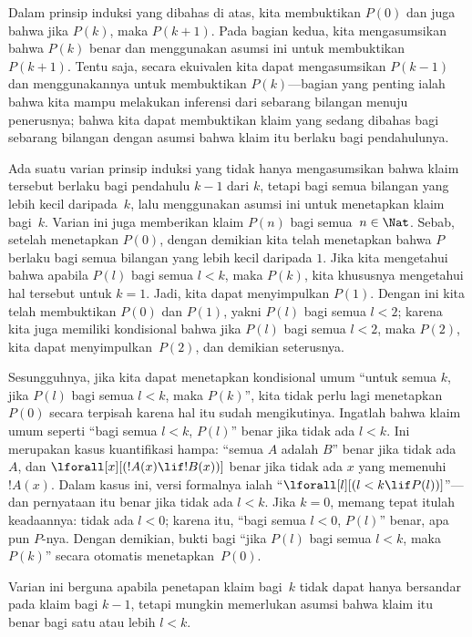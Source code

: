 \documentclass[../../../include/open-logic-section]{subfiles}
\begin{document}


Dalam prinsip induksi yang dibahas di atas, kita membuktikan $P(0)$ dan juga
bahwa jika $P(k)$, maka $P(k+1)$. Pada bagian kedua, kita mengasumsikan bahwa
$P(k)$ benar dan menggunakan asumsi ini untuk membuktikan $P(k+1)$. Tentu
saja, secara ekuivalen kita dapat mengasumsikan $P(k-1)$ dan menggunakannya
untuk membuktikan $P(k)$---bagian yang penting ialah bahwa kita mampu
melakukan inferensi dari sebarang bilangan menuju penerusnya; bahwa kita
dapat membuktikan klaim yang sedang dibahas bagi sebarang bilangan dengan
asumsi bahwa klaim itu berlaku bagi pendahulunya.

Ada suatu varian prinsip induksi yang tidak hanya mengasumsikan bahwa klaim
tersebut berlaku bagi pendahulu $k-1$ dari $k$, tetapi bagi semua bilangan
yang lebih kecil daripada~$k$, lalu menggunakan asumsi ini untuk menetapkan
klaim bagi~$k$. Varian ini juga memberikan klaim $P(n)$ bagi semua~$n \in
\Nat$. Sebab, setelah menetapkan $P(0)$, dengan demikian kita telah
menetapkan bahwa $P$ berlaku bagi semua bilangan yang lebih kecil daripada
$1$. Jika kita mengetahui bahwa apabila $P(l)$ bagi semua $l<k$, maka
$P(k)$, kita khususnya mengetahui hal tersebut untuk $k=1$. Jadi, kita dapat
menyimpulkan $P(1)$. Dengan ini kita telah membuktikan $P(0)$ dan $P(1)$,
yakni $P(l)$ bagi semua $l<2$; karena kita juga memiliki kondisional bahwa
jika $P(l)$ bagi semua $l<2$, maka $P(2)$, kita dapat menyimpulkan~$P(2)$,
dan demikian seterusnya.

Sesungguhnya, jika kita dapat menetapkan kondisional umum ``untuk semua
$k$, jika $P(l)$ bagi semua $l<k$, maka $P(k)$'', kita tidak perlu lagi
menetapkan $P(0)$ secara terpisah karena hal itu sudah mengikutinya. Ingatlah
bahwa klaim umum seperti ``bagi semua $l<k$, $P(l)$'' benar jika tidak ada
$l<k$. Ini merupakan kasus kuantifikasi hampa: ``semua $A$ adalah $B$''
benar jika tidak ada $A$, dan
$\lforall[x][(!A(x) \lif !B(x))]$ benar jika tidak ada $x$ yang memenuhi
$!A(x)$. Dalam kasus ini, versi formalnya ialah
``$\lforall[l][(l < k \lif P(l))]$''---dan pernyataan itu benar jika tidak
ada $l < k$. Jika $k=0$, memang tepat itulah keadaannya: tidak ada $l<0$;
karena itu, ``bagi semua $l<0$, $P(l)$'' benar, apa pun $P$-nya. Dengan
demikian, bukti bagi ``jika $P(l)$ bagi semua $l<k$, maka $P(k)$'' secara
otomatis menetapkan~$P(0)$.

Varian ini berguna apabila penetapan klaim bagi~$k$ tidak dapat hanya
bersandar pada klaim bagi $k-1$, tetapi mungkin memerlukan asumsi bahwa
klaim itu benar bagi satu atau lebih $l<k$.
\end{document}
